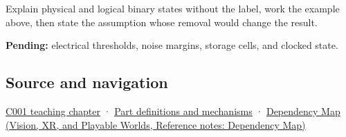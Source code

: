 Explain physical and logical binary states without the label, work the example above, then state the assumption whose removal would change the result.

\textbf{Pending:} electrical thresholds, noise margins, storage cells, and clocked state.

\subsection{Source and navigation}\label{appendix-ea798b1ceb35-source-and-navigation}

\hyperref[01-foundations-i-ch001-from-a-signal-to-an-interpretation]{C001 teaching chapter} · \hyperref[appendix-fd090d982a15]{Part definitions and mechanisms} · \href{../07-Vision-XR-and-Playable-Worlds/main.pdf\#nameddest=appendix-4ad47bdd269a}{Dependency Map (Vision, XR, and Playable Worlds, Reference notes: Dependency Map)}
